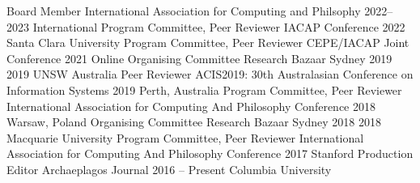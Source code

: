 
\begin{cventries}
\cventry
    {Board Member}
    {International Association for Computing and Philsophy}
    {2022--2023}
    {International}
    {}   
\cventry
    {Program Committee, Peer Reviewer}
    {IACAP Conference}
    {2022}
    {Santa Clara University}
    {}    
\cventry
    {Program Committee, Peer Reviewer}
    {CEPE/IACAP Joint Conference}
    {2021}
    {Online}
    {}    
\cventry
    {Organising Committee}
    {Research Bazaar Sydney 2019}
    {2019}
    {UNSW Australia}
    {}
\cventry
    {Peer Reviewer}
    {ACIS2019: 30th Australasian Conference on Information Systems}
    {2019}
    {Perth, Australia}
    {}
\cventry
    {Program Committee, Peer Reviewer}
    {International Association for Computing And Philosophy Conference}
    {2018}
    {Warsaw, Poland}
    {}    
\cventry
    {Organising Committee}
    {Research Bazaar Sydney 2018}
    {2018}
    {Macquarie University}
    {}    
\cventry
    {Program Committee, Peer Reviewer}
    {International Association for Computing And Philosophy Conference}
    {2017}
    {Stanford}
    {}
\cventry
    {Production Editor}
    {Archaeplagos Journal}
    {2016 -- Present}
    {Columbia University}
    {}    
\end{cventries}


